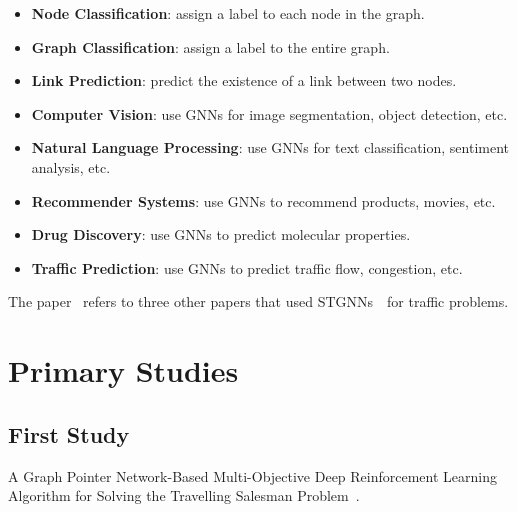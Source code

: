 \documentclass[10pt]{article}
\begin{document}
    \begin{itemize}
        \item \textbf{Node Classification}: assign a label to each node in the graph.
        \item \textbf{Graph Classification}: assign a label to the entire graph.
        \item \textbf{Link Prediction}: predict the existence of a link between two nodes.
        \item \textbf{Computer Vision}: use GNNs for image segmentation, object detection, etc.
        \item \textbf{Natural Language Processing}: use GNNs for text classification, sentiment analysis, etc.
        \item \textbf{Recommender Systems}: use GNNs to recommend products, movies, etc.
        \item \textbf{Drug Discovery}: use GNNs to predict molecular properties.
        \item \textbf{Traffic Prediction}: use GNNs to predict traffic flow, congestion, etc.
    \end{itemize}

    The paper~\cite{ref1} refers to three other papers that used STGNNs~\cite{ref5,ref6,ref7}~for traffic problems.


    \section{Primary Studies}\label{sec:primary-studies}

    \subsection{First Study}\label{subsec:first-study}
    A Graph Pointer Network-Based Multi-Objective Deep Reinforcement Learning Algorithm for Solving the Travelling Salesman Problem~\cite{ref8}.
\end{document}
